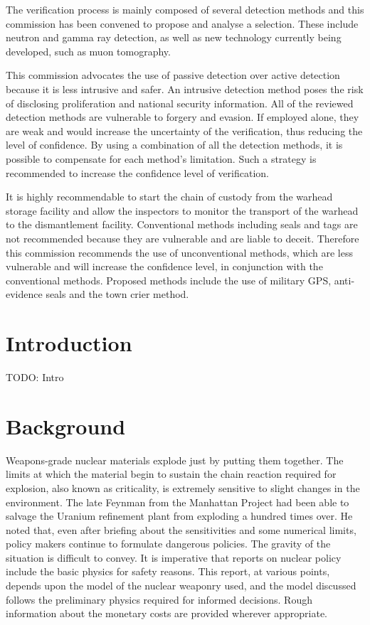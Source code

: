 \documentclass[twoside,titlepage,11pt,twocolumn,a4paper]{article}
\begin{document}
The verification process is mainly composed of several detection
methods and this commission has been convened to propose and analyse a
selection. These include neutron and gamma ray detection, as well as
new technology currently being developed, such as muon tomography.

This commission advocates the use of passive detection over active
detection because it is less intrusive and safer. An intrusive
detection method poses the risk of disclosing proliferation and
national security information. All of the reviewed detection methods
are vulnerable to forgery and evasion. If employed alone, they are
weak and would increase the uncertainty of the verification, thus
reducing the level of confidence. By using a combination of all the
detection methods, it is possible to compensate for each method’s
limitation. Such a strategy is recommended to increase the confidence
level of verification.

It is highly recommendable to start the chain of custody from the
warhead storage facility and allow the inspectors to monitor the
transport of the warhead to the dismantlement facility. Conventional
methods including seals and tags are not recommended because they are
vulnerable and are liable to deceit. Therefore this commission
recommends the use of unconventional methods, which are less
vulnerable and will increase the confidence level, in conjunction with
the conventional methods. Proposed methods include the use of military
GPS, anti-evidence seals and the town crier method.

\newpage
\tableofcontents
\twocolumn

\section{Introduction}
TODO: Intro
\section{Background}
Weapons-grade nuclear materials explode just by putting them
together. The limits at which the material begin to sustain the chain
reaction required for explosion, also known as criticality, is
extremely sensitive to slight changes in the environment. The late
Feynman from the Manhattan Project had been able to salvage the
Uranium refinement plant from exploding a hundred times over. He noted
that, even after briefing about the sensitivities and some numerical
limits, policy makers continue to formulate dangerous
policies. \citep{FeynmanJoking} The gravity of the situation is
difficult to convey. It is imperative that reports on nuclear policy
include the basic physics for safety reasons. This report, at various
points, depends upon the model of the nuclear weaponry used, and the
model discussed follows the preliminary physics required for informed
decisions. Rough information about the monetary costs are provided
wherever appropriate.
\end{document}
